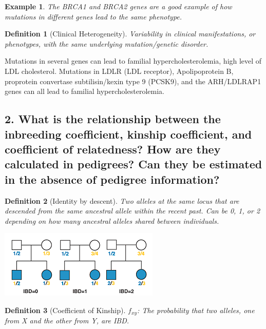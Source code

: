 \documentclass{tufte-handout}
\theoremstyle{noparens}
\newtheorem*{define}{Definition}
\newtheorem*{example}{Example}
\begin{document}
\begin{example}
The BRCA1 and BRCA2 genes are a good example of how mutations in different genes lead to the same phenotype. 
\end{example}

\begin{define}[Clinical Heterogeneity]
Variability in clinical manifestations, or phenotypes, with the same underlying mutation/genetic disorder.
\end{define}

Mutations in several genes can lead to familial hypercholesterolemia, high level of LDL cholesterol. Mutations in LDLR (LDL receptor), Apolipoprotein B, proprotein convertase subtilisin/kexin type 9 (PCSK9), and the ARH/LDLRAP1 genes can all lead to familial hypercholesterolemia.

\newpage
\subsection{2.
What is the relationship between the inbreeding coefficient, kinship coefficient, and coefficient of relatedness? How are they calculated in pedigrees? Can they be estimated in the absence of pedigree information?}
\label{subsec:02} 

\begin{define}[Identity by descent]
Two alleles at the same locus that are descended from the same ancestral allele within the recent past. Can be 0, 1, or 2 depending on how many ancestral alleles shared between individuals.
\end{define}

\begin{marginfigure}%
  \includegraphics[scale=0.65]{./figs/ibd}
  \caption{IBD Pedigree Example}
  \label{fig:marginfig}
\end{marginfigure}

\begin{define}[Coefficient of Kinship]
$f_{xy}$: The probability that two alleles, one from X and the other from Y, are IBD.
\end{define}
\end{document}
